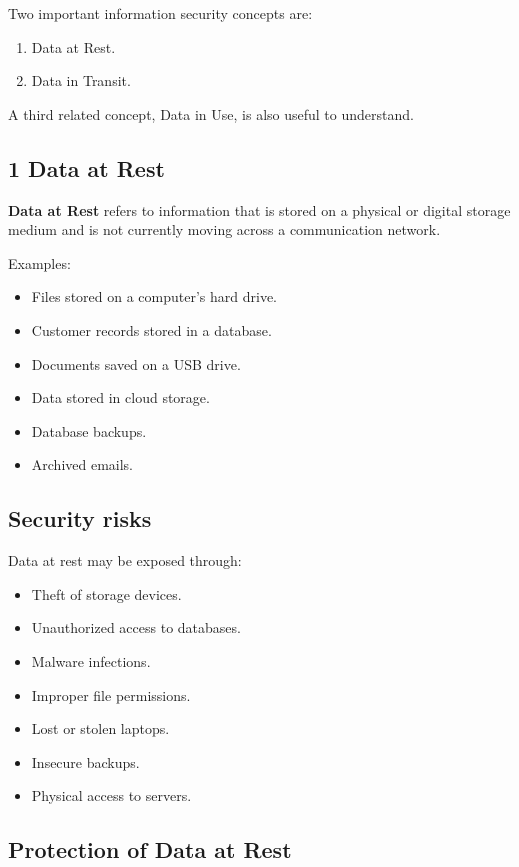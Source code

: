 Two important information security concepts are:

\begin{enumerate}
\item Data at Rest.
\item Data in Transit.
\end{enumerate}

A third related concept, Data in Use, is also useful to understand.

\subsection{1 Data at Rest}

\textbf{Data at Rest} refers to information that is stored on a physical or digital storage medium and is not currently moving across a communication network.

Examples:

\begin{itemize}
\item Files stored on a computer's hard drive.
\item Customer records stored in a database.
\item Documents saved on a USB drive.
\item Data stored in cloud storage.
\item Database backups.
\item Archived emails.
\end{itemize}

\subsection{Security risks}

Data at rest may be exposed through:

\begin{itemize}
\item Theft of storage devices.
\item Unauthorized access to databases.
\item Malware infections.
\item Improper file permissions.
\item Lost or stolen laptops.
\item Insecure backups.
\item Physical access to servers.
\end{itemize}

\subsection{Protection of Data at Rest}

